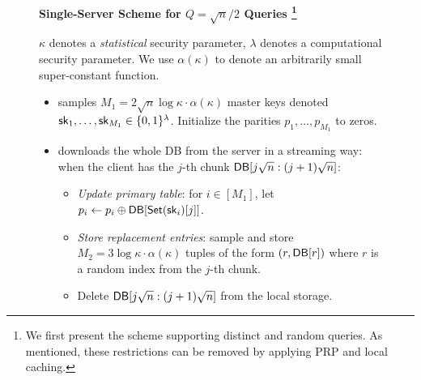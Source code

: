 \begin{figure}[p]
    
    \begin{minipage}{\textwidth}
        \begin{mdframed}
            \label{alg:fulloneserv}
            \begin{center}
                {\bf Single-Server Scheme for $Q=\sqrt{n}/2$ Queries
                    \footnote{We first present the scheme supporting distinct and random queries. As mentioned, these restrictions can be removed by applying PRP and local caching.}
                }
            \end{center}
            $\kappa$ denotes a {\it statistical} security parameter, $\lambda$
            denotes a computational security parameter. We use $\alpha(\kappa)$
            to denote an arbitrarily small super-constant function.
            
            
            \begin{itemize}[leftmargin=3mm,itemsep=1pt]
                \item 
                \Client samples $M_1=2\sqrt{n}\log \kappa \cdot \alpha(\kappa)$
                master \ppps keys denoted ${\sf sk}_1, \dots, {\sf sk}_{M_1} \in \{0,
                1\}^\lambda$.
                Initialize the parities $p_1,\dots,p_{M_1}$ to zeros.
                
                
                \item 
                \Client downloads the whole DB from the server in a streaming
                way: when the client has the $j$-th chunk
                $\mathsf{DB}[j\sqrt{n}:(j+1)\sqrt{n}]$:
                \begin{itemize}
                    \item {\it Update primary table}: for $i \in [M_1]$, let
                    $p_i \leftarrow p_i \oplus \mathsf{DB}[\mathsf{Set}({\sf sk}_i)[j]]$.
                    \item {\it Store replacement entries}: sample and store
                    $M_2=3\log \kappa \cdot \alpha(\kappa)$ %
                    tuples of the form $(r, \mathsf{DB}[r])$ where $r$ is a random index
                    from the $j$-th chunk.
                    \item Delete $\mathsf{DB}[j \sqrt{n}:(j +1)\sqrt{n}]$ from the local
                    storage.
                \end{itemize}
                

\end{itemize}
\end{mdframed}
\end{minipage}
\end{figure}
